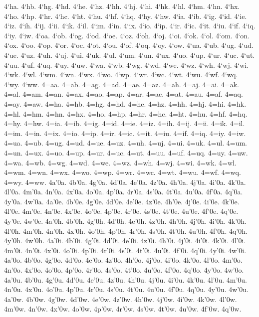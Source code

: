 {4`ha.
4`hb.
4`hg.
4`hd.
4`he.
4`hz.
4`hh.
4`hj.
4`hi.
4`hk.
4`hl.
4`hm.
4`hn.
4`hx.
4`ho.
4`hp.
4`hr.
4`hc.
4`ht.
4`hu.
4`hf.
4`hq.
4`hy.
4`hw.
4`ia.
4`ib.
4`ig.
4`id.
4`ie.
4`iz.
4`ih.
4`ij.
4`ii.
4`ik.
4`il.
4`im.
4`in.
4`ix.
4`io.
4`ip.
4`ir.
4`ic.
4`it.
4`iu.
4`if.
4`iq.
4`iy.
4`iw.
4`oa.
4`ob.
4`og.
4`od.
4`oe.
4`oz.
4`oh.
4`oj.
4`oi.
4`ok.
4`ol.
4`om.
4`on.
4`ox.
4`oo.
4`op.
4`or.
4`oc.
4`ot.
4`ou.
4`of.
4`oq.
4`oy.
4`ow.
4`ua.
4`ub.
4`ug.
4`ud.
4`ue.
4`uz.
4`uh.
4`uj.
4`ui.
4`uk.
4`ul.
4`um.
4`un.
4`ux.
4`uo.
4`up.
4`ur.
4`uc.
4`ut.
4`uu.
4`uf.
4`uq.
4`uy.
4`uw.
4`wa.
4`wb.
4`wg.
4`wd.
4`we.
4`wz.
4`wh.
4`wj.
4`wi.
4`wk.
4`wl.
4`wm.
4`wn.
4`wx.
4`wo.
4`wp.
4`wr.
4`wc.
4`wt.
4`wu.
4`wf.
4`wq.
4`wy.
4`ww.
4=aa.
4=ab.
4=ag.
4=ad.
4=ae.
4=az.
4=ah.
4=aj.
4=ai.
4=ak.
4=al.
4=am.
4=an.
4=ax.
4=ao.
4=ap.
4=ar.
4=ac.
4=at.
4=au.
4=af.
4=aq.
4=ay.
4=aw.
4=ha.
4=hb.
4=hg.
4=hd.
4=he.
4=hz.
4=hh.
4=hj.
4=hi.
4=hk.
4=hl.
4=hm.
4=hn.
4=hx.
4=ho.
4=hp.
4=hr.
4=hc.
4=ht.
4=hu.
4=hf.
4=hq.
4=hy.
4=hw.
4=ia.
4=ib.
4=ig.
4=id.
4=ie.
4=iz.
4=ih.
4=ij.
4=ii.
4=ik.
4=il.
4=im.
4=in.
4=ix.
4=io.
4=ip.
4=ir.
4=ic.
4=it.
4=iu.
4=if.
4=iq.
4=iy.
4=iw.
4=ua.
4=ub.
4=ug.
4=ud.
4=ue.
4=uz.
4=uh.
4=uj.
4=ui.
4=uk.
4=ul.
4=um.
4=un.
4=ux.
4=uo.
4=up.
4=ur.
4=uc.
4=ut.
4=uu.
4=uf.
4=uq.
4=uy.
4=uw.
4=wa.
4=wb.
4=wg.
4=wd.
4=we.
4=wz.
4=wh.
4=wj.
4=wi.
4=wk.
4=wl.
4=wm.
4=wn.
4=wx.
4=wo.
4=wp.
4=wr.
4=wc.
4=wt.
4=wu.
4=wf.
4=wq.
4=wy.
4=ww.
4a'0a.
4b'0a.
4g'0a.
4d'0a.
4e'0a.
4z'0a.
4h'0a.
4j'0a.
4i'0a.
4k'0a.
4l'0a.
4m'0a.
4n'0a.
4x'0a.
4o'0a.
4p'0a.
4r'0a.
4s'0a.
4t'0a.
4u'0a.
4f'0a.
4q'0a.
4y'0a.
4w'0a.
4a'0e.
4b'0e.
4g'0e.
4d'0e.
4e'0e.
4z'0e.
4h'0e.
4j'0e.
4i'0e.
4k'0e.
4l'0e.
4m'0e.
4n'0e.
4x'0e.
4o'0e.
4p'0e.
4r'0e.
4s'0e.
4t'0e.
4u'0e.
4f'0e.
4q'0e.
4y'0e.
4w'0e.
4a'0h.
4b'0h.
4g'0h.
4d'0h.
4e'0h.
4z'0h.
4h'0h.
4j'0h.
4i'0h.
4k'0h.
4l'0h.
4m'0h.
4n'0h.
4x'0h.
4o'0h.
4p'0h.
4r'0h.
4s'0h.
4t'0h.
4u'0h.
4f'0h.
4q'0h.
4y'0h.
4w'0h.
4a'0i.
4b'0i.
4g'0i.
4d'0i.
4e'0i.
4z'0i.
4h'0i.
4j'0i.
4i'0i.
4k'0i.
4l'0i.
4m'0i.
4n'0i.
4x'0i.
4o'0i.
4p'0i.
4r'0i.
4s'0i.
4t'0i.
4u'0i.
4f'0i.
4q'0i.
4y'0i.
4w'0i.
4a'0o.
4b'0o.
4g'0o.
4d'0o.
4e'0o.
4z'0o.
4h'0o.
4j'0o.
4i'0o.
4k'0o.
4l'0o.
4m'0o.
4n'0o.
4x'0o.
4o'0o.
4p'0o.
4r'0o.
4s'0o.
4t'0o.
4u'0o.
4f'0o.
4q'0o.
4y'0o.
4w'0o.
4a'0u.
4b'0u.
4g'0u.
4d'0u.
4e'0u.
4z'0u.
4h'0u.
4j'0u.
4i'0u.
4k'0u.
4l'0u.
4m'0u.
4n'0u.
4x'0u.
4o'0u.
4p'0u.
4r'0u.
4s'0u.
4t'0u.
4u'0u.
4f'0u.
4q'0u.
4y'0u.
4w'0u.
4a'0w.
4b'0w.
4g'0w.
4d'0w.
4e'0w.
4z'0w.
4h'0w.
4j'0w.
4i'0w.
4k'0w.
4l'0w.
4m'0w.
4n'0w.
4x'0w.
4o'0w.
4p'0w.
4r'0w.
4s'0w.
4t'0w.
4u'0w.
4f'0w.
4q'0w.
}
